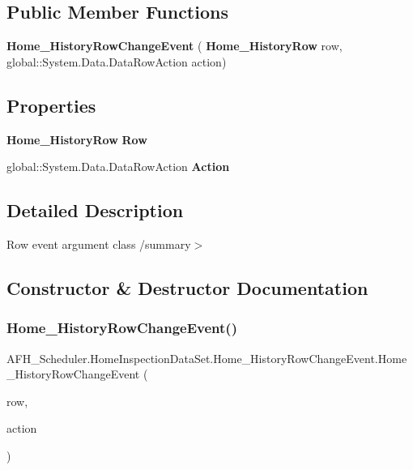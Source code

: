 \subsection*{Public Member Functions}
\begin{DoxyCompactItemize}
\item 
\textbf{ Home\+\_\+\+History\+Row\+Change\+Event} (\textbf{ Home\+\_\+\+History\+Row} row, global\+::\+System.\+Data.\+Data\+Row\+Action action)
\end{DoxyCompactItemize}
\subsection*{Properties}
\begin{DoxyCompactItemize}
\item 
\textbf{ Home\+\_\+\+History\+Row} \textbf{ Row}\hspace{0.3cm}{\ttfamily  [get]}
\item 
global\+::\+System.\+Data.\+Data\+Row\+Action \textbf{ Action}\hspace{0.3cm}{\ttfamily  [get]}
\end{DoxyCompactItemize}


\subsection{Detailed Description}
Row event argument class /summary$>$ 

\subsection{Constructor \& Destructor Documentation}
\mbox{\label{class_a_f_h___scheduler_1_1_home_inspection_data_set_1_1_home___history_row_change_event_a3b289c21471ebcafee1abf733e41d518}} 
\subsubsection{Home\_HistoryRowChangeEvent()}
{\footnotesize\ttfamily A\+F\+H\+\_\+\+Scheduler.\+Home\+Inspection\+Data\+Set.\+Home\+\_\+\+History\+Row\+Change\+Event.\+Home\+\_\+\+History\+Row\+Change\+Event (\begin{DoxyParamCaption}\item[{\textbf{ Home\+\_\+\+History\+Row}}]{row,  }\item[{global\+::\+System.\+Data.\+Data\+Row\+Action}]{action }\end{DoxyParamCaption})}



